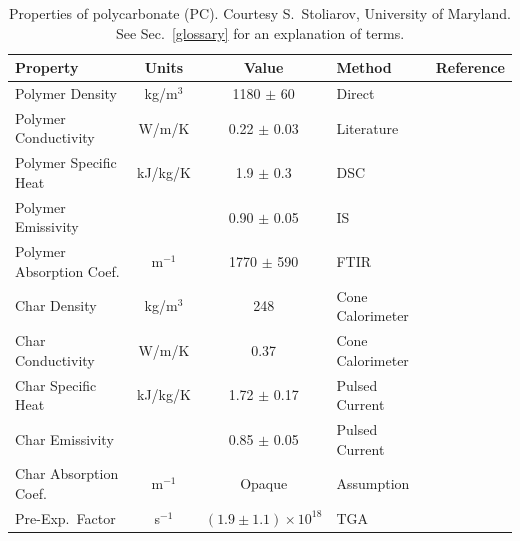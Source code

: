 \begin{table}[h!]
\caption[Properties of polycarbonate (PC)]{Properties of polycarbonate (PC). Courtesy S.~Stoliarov, University of Maryland. See Sec.~\ref{glossary} for an explanation of terms.}
\begin{center}
\begin{tabular}{|l|c|c|l|l|}
\hline
Property                    & Units         & Value                             & Method                &  Reference                                \\ \hline \hline
Polymer Density             & kg/m$^3$      & 1180 $\pm$ 60                     & Direct                &  \cite{Stoliarov:CF2010}                  \\ \hline
Polymer Conductivity        & W/m/K         & 0.22 $\pm$ 0.03                   & Literature            &  \cite{Stoliarov:CF2010}                  \\ \hline
Polymer Specific Heat       & kJ/kg/K       & 1.9 $\pm$ 0.3                     & DSC                   &  \cite{Stoliarov:PDS2008}                 \\ \hline
Polymer Emissivity          &               & 0.90 $\pm$ 0.05                   & IS                    &  \cite{Hallman:PES1974}                   \\ \hline
Polymer Absorption Coef.    & m$^{-1}$      & 1770 $\pm$ 590                    & FTIR                  &  \cite{Tsilingiris:ECM2003}               \\ \hline
Char Density                & kg/m$^3$      & 248                               & Cone Calorimeter      &  \cite{Stoliarov:CF2010}                  \\ \hline
Char Conductivity           & W/m/K         & 0.37                              & Cone Calorimeter      &  \cite{Stoliarov:CF2010}                  \\ \hline
Char Specific Heat          & kJ/kg/K       & 1.72 $\pm$ 0.17                   & Pulsed Current        &  \cite{Stoliarov:CF2010,Matsumoto:1996}   \\ \hline
Char Emissivity             &               & 0.85 $\pm$ 0.05                   & Pulsed Current        &  \cite{Stoliarov:CF2010,Matsumoto:1996}   \\ \hline
Char Absorption Coef.       & m$^{-1}$      & Opaque                            & Assumption            &  \cite{Stoliarov:CF2010}                  \\ \hline
Pre-Exp.~Factor             & s$^{-1}$      & $(1.9 \pm 1.1) \times 10^{18}$    & TGA                   &  \cite{Stoliarov:CF2010}                  \\ \hline

\end{tabular}
\end{center}
\end{table}

